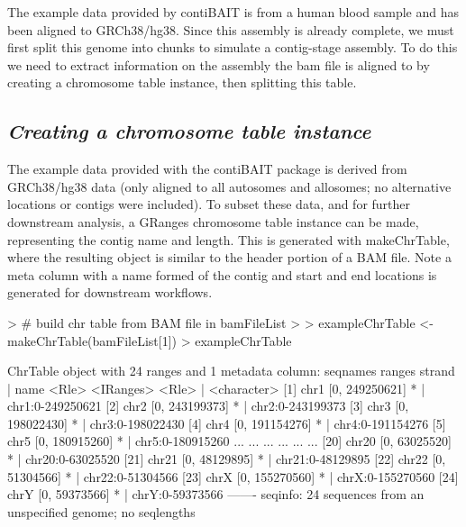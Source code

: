 \documentclass{article}
\begin{document}
\begin{Schunk}
\end{Schunk}

The example data provided by contiBAIT is from a human blood sample and has been aligned to GRCh38/hg38.  Since this assembly is already complete, we must first split this genome into chunks to simulate a contig-stage assembly. To do this we need to extract information on the assembly the bam file is aligned to by creating a chromosome table instance, then splitting this table.

\subsection{\textit{Creating a chromosome table instance}}

The example data provided with the contiBAIT package is derived from GRCh38/hg38 data (only aligned to all autosomes and allosomes; no alternative locations or contigs were included). To subset these data, and for further downstream analysis, a GRanges chromosome table instance can be made, representing the contig name and length. This is generated with makeChrTable, where the resulting object is similar to the header portion of a BAM file. Note a meta column with a name formed of the contig and start and end locations is generated for downstream workflows.

\begin{Schunk}
\begin{Sinput}
> # build chr table from BAM file in bamFileList
> 
> exampleChrTable <- makeChrTable(bamFileList[1]) 
> exampleChrTable
\end{Sinput}
\begin{Soutput}
ChrTable object with 24 ranges and 1 metadata column:
       seqnames         ranges strand   |             name
          <Rle>      <IRanges>  <Rle>   |      <character>
   [1]     chr1 [0, 249250621]      *   | chr1:0-249250621
   [2]     chr2 [0, 243199373]      *   | chr2:0-243199373
   [3]     chr3 [0, 198022430]      *   | chr3:0-198022430
   [4]     chr4 [0, 191154276]      *   | chr4:0-191154276
   [5]     chr5 [0, 180915260]      *   | chr5:0-180915260
   ...      ...            ...    ... ...              ...
  [20]    chr20 [0,  63025520]      *   | chr20:0-63025520
  [21]    chr21 [0,  48129895]      *   | chr21:0-48129895
  [22]    chr22 [0,  51304566]      *   | chr22:0-51304566
  [23]     chrX [0, 155270560]      *   | chrX:0-155270560
  [24]     chrY [0,  59373566]      *   |  chrY:0-59373566
  -------
  seqinfo: 24 sequences from an unspecified genome; no seqlengths
\end{Soutput}
\end{Schunk}
\end{document}

